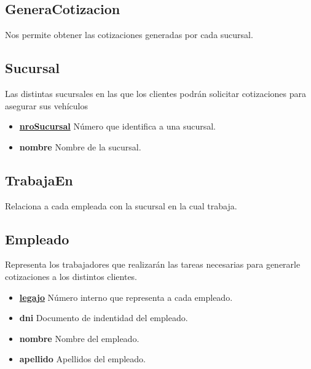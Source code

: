 \documentclass[a4paper,11pt]{article}
\begin{document}
\subsection{GeneraCotizacion}

Nos permite obtener las cotizaciones generadas por cada sucursal.

\subsection{Sucursal}

Las distintas sucursales en las que los clientes podrán solicitar cotizaciones para asegurar sus vehículos

\begin{itemize}
   
  \item \textbf{\uline{nroSucursal}} Número que identifica a una sucursal.
  
  \item \textbf{nombre} Nombre de la sucursal.
  
\end{itemize}

\subsection{TrabajaEn}

Relaciona a cada empleada con la sucursal en la cual trabaja.

\subsection{Empleado}

Representa los trabajadores que realizarán las tareas necesarias para generarle cotizaciones
a los distintos clientes.

\begin{itemize}
   
  \item \textbf{\uline{legajo}} Número interno que representa a cada empleado.
  
  \item \textbf{dni} Documento de indentidad del empleado.
  
  \item \textbf{nombre} Nombre del empleado.
  
  \item \textbf{apellido} Apellidos del empleado.
  
\end{itemize}
\end{document}

